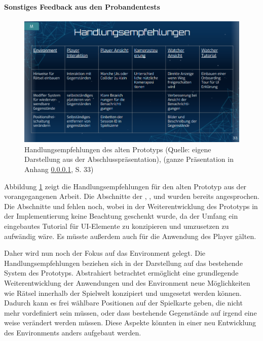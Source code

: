 
\paragraph{Sonstiges Feedback aus den Probandentests}
\begin{figure}[ht]
\centering
\includegraphics[width=1\linewidth]{content/pictures/Handlungsempfehlungen.PNG}
\caption{Handlungsempfehlungen des alten Prototyps (Quelle: eigene Darstellung aus der Abschlusspräsentation), (ganze Präsentation in Anhang \ref{}, S. 33)}
\label{fig:recommended-action}
\end{figure}

Abbildung \ref{fig:recommended-action} zeigt die Handlungsempfehlungen für den alten Prototyp aus der vorangegangenen Arbeit. Die Abschnitte der , ,  und  wurden bereits angesprochen. Die Abschnitte  und  fehlen noch, wobei  in der Weiterentwicklung des Prototyps in der Implementierung keine Beachtung geschenkt wurde, da der Umfang ein eingebautes Tutorial für \ac{UI}-Elemente zu konzipieren und umzusetzen zu aufwändig wäre. Es müsste außerdem auch für die Anwendung des Player gälten.

Daher wird nun noch der Fokus auf das Environment gelegt. Die Handlungsempfehlungen beziehen sich in der Darstellung auf das bestehende System des Prototyps. Abstrahiert betrachtet ermöglicht eine grundlegende Weiterentwicklung der Anwendungen und des Environment neue Möglichkeiten wie Rätsel innerhalb der Spielwelt konzipiert und umgesetzt werden können. Dadurch kann es frei wählbare Positionen auf der Spielkarte geben, die nicht mehr vordefiniert sein müssen, oder dass bestehende Gegenstände auf irgend eine weise verändert werden müssen. Diese Aspekte könnten in einer neu Entwicklung des Environments anders aufgebaut werden.

